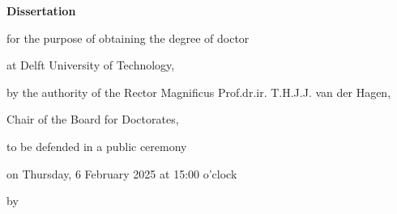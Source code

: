 \begin{titlepage}

\begin{center}

\vspace*{2\bigskipamount}

{\makeatletter
\titlestyle\bfseries\LARGE\@title
\makeatother}

{\makeatletter
\ifx\@subtitle\undefined\else
    \bigskip
    \titlefont\titleshape\Large\@subtitle
\fi
\makeatother}

\end{center}

\cleardoublepage
\thispagestyle{empty}

\begin{center}


\vspace*{2\bigskipamount}

{\makeatletter
\titlestyle\bfseries\LARGE\@title
\makeatother}

{\makeatletter
\ifx\@subtitle\undefined\else
    \bigskip
    \titlefont\titleshape\Large\@subtitle
\fi
\makeatother}

\vfill


{\Large\titlefont\bfseries Dissertation}

\bigskip
\bigskip

for the purpose of obtaining the degree of doctor

at Delft University of Technology,

by the authority of the Rector Magnificus Prof.dr.ir. T.H.J.J. van der Hagen,

Chair of the Board for Doctorates,

to be defended in a public ceremony

on Thursday, 6 February 2025 at 15:00 o'clock

\bigskip
\bigskip

by

\bigskip
\bigskip

\makeatletter
{\Large\titlefont\bfseries\@firstname\ \titleshape{\MakeUppercase{\@lastname}}}
\makeatother


\end{center}
\end{titlepage}
